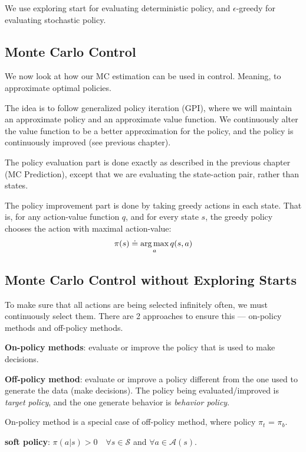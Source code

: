 \documentclass[sutton_barto_notes.tex]{subfiles}
\begin{document}
We use exploring start for evaluating deterministic policy, and $\epsilon$-greedy for evaluating stochastic policy.

\subsection{Monte Carlo Control}

We now look at how our MC estimation can be used in control. Meaning, to approximate optimal policies.

The idea is to follow generalized policy iteration (GPI), where we will maintain an approximate policy and an approximate value function.
We continuously alter the value function to be a better approximation for the policy, and the policy is continuously improved (see previous chapter).


The policy evaluation part is done exactly as described in the previous chapter (MC Prediction), except that we are evaluating the state-action pair, rather than states.

The policy improvement part is done by taking greedy actions in each state. That is, for any action-value function $q$, and for every state $s$, the greedy policy chooses the action with maximal action-value:
$$ \pi(s) \doteq \operatorname*{arg\,max}_a q(s,a) $$

\subsection{Monte Carlo Control without Exploring Starts}

To make sure that all actions are being selected infinitely often, we must continuously select them.
There are 2 approaches to ensure this — on-policy methods and off-policy methods.

\begin{definition}
\textbf{On-policy methods}: evaluate or improve the policy that is used to make decisions.
\end{definition}
\begin{definition}
\textbf{Off-policy method}: evaluate or improve a policy different from the one used to generate the data (make decisions). The policy being evaluated/improved is \textit{target policy}, and the one generate behavior is \textit{behavior policy}.
\end{definition}

On-policy method is a special case of off-policy method, where policy $\pi_t$ = $\pi_b$.

\begin{definition}
\textbf{soft policy}: $\pi(a|s) > 0\quad \forall s \in \mathcal{S}$ and $\forall a \in \mathcal{A}(s).$
\end{definition}
\end{document}
